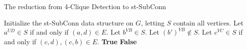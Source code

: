 \documentclass{article}
\begin{document}
\begin{algorithm}
\caption{The reduction from 4-Clique Detection to st-SubConn}
\begin{algorithmic}[1]
\State Initialize the st-SubConn data structure on $G$, letting $S$ contain all vertices.
        \State Let $a^{UD} \in S$ if and only if $(a,d) \in E$.
    \EndFor
        \State Let $b^{VB} \in S$.
            \State Let $(b')^{VB} \notin S$.
        \EndFor
            \State Let $c^{VC} \in S$ if and only if $(c,d), (c,b) \in E$.
        \EndFor
            \State \Return \textbf{True}
        \EndIf
    \EndFor
\EndFor
\State \Return \textbf{False}
\end{algorithmic}
\end{algorithm}
\end{document}

